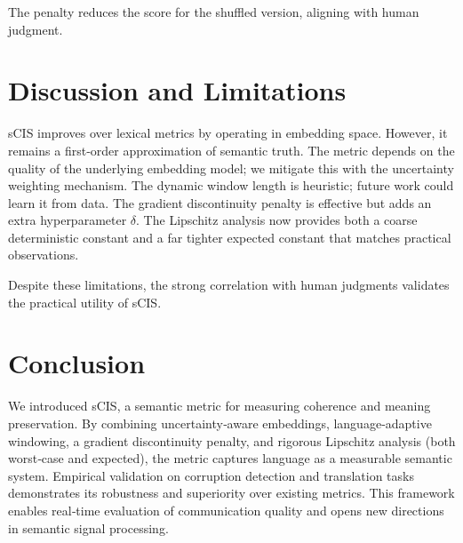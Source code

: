 \documentclass[11pt]{article}
\theoremstyle{definition}
\begin{document}
The penalty reduces the score for the shuffled version, aligning with human judgment.

\section{Discussion and Limitations}

sCIS improves over lexical metrics by operating in embedding space. However, it remains a first‑order approximation of semantic truth. The metric depends on the quality of the underlying embedding model; we mitigate this with the uncertainty weighting mechanism. The dynamic window length is heuristic; future work could learn it from data. The gradient discontinuity penalty is effective but adds an extra hyperparameter $\delta$. The Lipschitz analysis now provides both a coarse deterministic constant and a far tighter expected constant that matches practical observations.

Despite these limitations, the strong correlation with human judgments validates the practical utility of sCIS.

\section{Conclusion}

We introduced sCIS, a semantic metric for measuring coherence and meaning preservation. By combining uncertainty‑aware embeddings, language‑adaptive windowing, a gradient discontinuity penalty, and rigorous Lipschitz analysis (both worst‑case and expected), the metric captures language as a measurable semantic system. Empirical validation on corruption detection and translation tasks demonstrates its robustness and superiority over existing metrics. This framework enables real‑time evaluation of communication quality and opens new directions in semantic signal processing.
\end{document}
